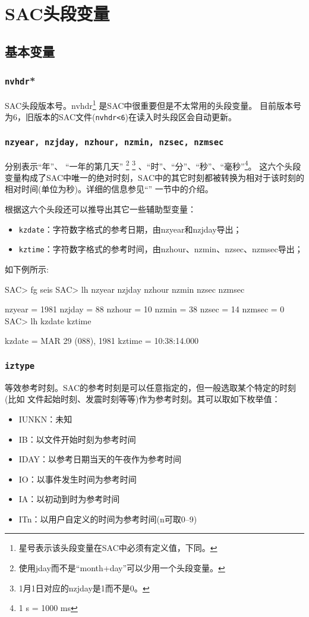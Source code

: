 \section{SAC头段变量}
\label{sec:sac-header-variables}

\subsection{基本变量}

\subsubsection{\texttt{nvhdr}*}
SAC头段版本号。nvhdr\footnote{星号表示该头段变量在SAC中必须有定义值，下同。}
是SAC中很重要但是不太常用的头段变量。
目前版本号为6，旧版本的SAC文件(\texttt{nvhdr<6})在读入时头段区会自动更新。

\subsubsection{\texttt{nzyear, nzjday, nzhour, nzmin, nzsec, nzmsec}}
分别表示``年''、
``一年的第几天''
\footnote{使用jday而不是``month+day''可以少用一个头段变量。}
\footnote{1月1日对应的nzjday是1而不是0。}
、``时''、``分''、``秒''、``毫秒''\footnote{1 s = 1000 ms}。
这六个头段变量构成了SAC中唯一的绝对时刻，SAC中的其它时刻都被转换为相对于该时刻的
相对时间(单位为秒)。详细的信息参见``'' 一节中的介绍。

根据这六个头段还可以推导出其它一些辅助型变量：
\begin{itemize}
\item \texttt{kzdate}：字符数字格式的参考日期，由nzyear和nzjday导出；
\item \texttt{kztime}：字符数字格式的参考时间，由nzhour、nzmin、nzsec、nzmsec导出；
\end{itemize}

如下例所示:
\begin{SACCode}
SAC> fg seis
SAC> lh nzyear nzjday nzhour nzmin nzsec nzmsec

     nzyear = 1981
     nzjday = 88
     nzhour = 10
      nzmin = 38
      nzsec = 14
     nzmsec = 0
SAC> lh kzdate kztime

     kzdate = MAR 29 (088), 1981
     kztime = 10:38:14.000
\end{SACCode}

\subsubsection{\texttt{iztype}}
等效参考时刻。SAC的参考时刻是可以任意指定的，但一般选取某个特定的时刻(比如
文件起始时刻、发震时刻等等)作为参考时刻。其可以取如下枚举值：
\begin{itemize}
\ttfamily
\item IUNKN：未知
\item IB：以文件开始时刻为参考时间
\item IDAY：以参考日期当天的午夜作为参考时间
\item IO：以事件发生时间为参考时间
\item IA：以初动到时为参考时间
\item ITn：以用户自定义的时间为参考时间(n可取0--9)
\end{itemize}

